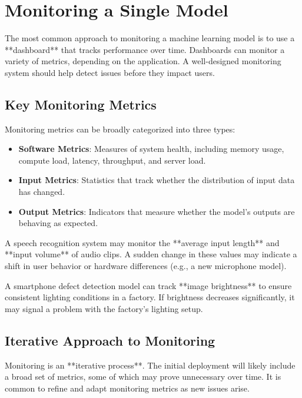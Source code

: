 \documentclass[12pt,openany]{book}
\begin{document}
\section{Monitoring a Single Model}

The most common approach to monitoring a machine learning model is to use a **dashboard** that tracks performance over time. Dashboards can monitor a variety of metrics, depending on the application. A well-designed monitoring system should help detect issues before they impact users.

\subsection{Key Monitoring Metrics}

Monitoring metrics can be broadly categorized into three types:

\begin{itemize}
    \item \textbf{Software Metrics}: Measures of system health, including memory usage, compute load, latency, throughput, and server load.
    \item \textbf{Input Metrics}: Statistics that track whether the distribution of input data has changed.
    \item \textbf{Output Metrics}: Indicators that measure whether the model's outputs are behaving as expected.
\end{itemize}

\begin{examplebox}
   A speech recognition system may monitor the **average input length** and **input volume** of audio clips. A sudden change in these values may indicate a shift in user behavior or hardware differences (e.g., a new microphone model).
\end{examplebox}

\begin{examplebox}
   A smartphone defect detection model can track **image brightness** to ensure consistent lighting conditions in a factory. If brightness decreases significantly, it may signal a problem with the factory's lighting setup.
\end{examplebox}

\subsection{Iterative Approach to Monitoring}

Monitoring is an **iterative process**. The initial deployment will likely include a broad set of metrics, some of which may prove unnecessary over time. It is common to refine and adapt monitoring metrics as new issues arise.
\end{document}
